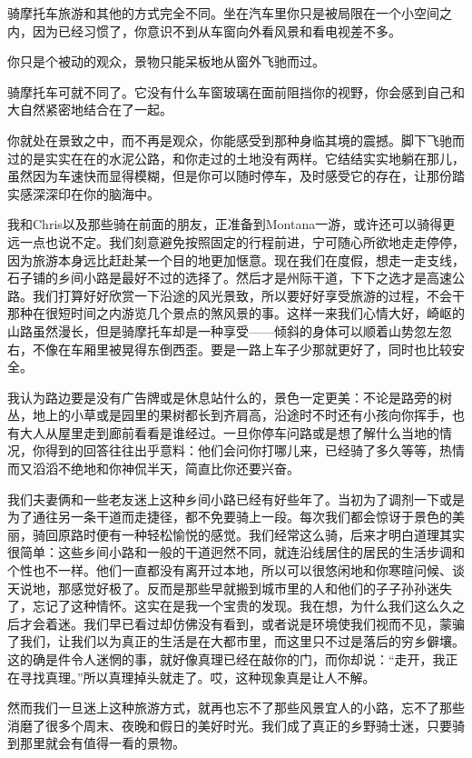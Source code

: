 \documentclass[UTF8]{article}
\begin{document}
\par 骑摩托车旅游和其他的方式完全不同。坐在汽车里你只是被局限在一个小空间之内，因为已经习惯了，你意识不到从车窗向外看风景和看电视差不多。
\par 你只是个被动的观众，景物只能呆板地从窗外飞驰而过。
\par 骑摩托车可就不同了。它没有什么车窗玻璃在面前阻挡你的视野，你会感到自己和大自然紧密地结合在了一起。
\par 你就处在景致之中，而不再是观众，你能感受到那种身临其境的震撼。脚下飞驰而过的是实实在在的水泥公路，和你走过的土地没有两样。它结结实实地躺在那儿，虽然因为车速快而显得模糊，但是你可以随时停车，及时感受它的存在，让那份踏实感深深印在你的脑海中。
\par 我和Chris以及那些骑在前面的朋友，正准备到Montana一游，或许还可以骑得更远一点也说不定。我们刻意避免按照固定的行程前进，宁可随心所欲地走走停停，因为旅游本身远比赶赴某一个目的地更加惬意。现在我们在度假，想走一走支线，石子铺的乡间小路是最好不过的选择了。然后才是州际干道，下下之选才是高速公路。我们打算好好欣赏一下沿途的风光景致，所以要好好享受旅游的过程，不会干那种在很短时间之内游览几个景点的煞风景的事。这样一来我们心情大好，崎岖的山路虽然漫长，但是骑摩托车却是一种享受——倾斜的身体可以顺着山势忽左忽右，不像在车厢里被晃得东倒西歪。要是一路上车子少那就更好了，同时也比较安全。
\par 我认为路边要是没有广告牌或是休息站什么的，景色一定更美：不论是路旁的树丛，地上的小草或是园里的果树都长到齐肩高，沿途时不时还有小孩向你挥手，也有大人从屋里走到廊前看看是谁经过。一旦你停车问路或是想了解什么当地的情况，你得到的回答往往出乎意料：他们会问你打哪儿来，已经骑了多久等等，热情而又滔滔不绝地和你神侃半天，简直比你还要兴奋。
\par 我们夫妻俩和一些老友迷上这种乡间小路已经有好些年了。当初为了调剂一下或是为了通往另一条干道而走捷径，都不免要骑上一段。每次我们都会惊讶于景色的美丽，骑回原路时便有一种轻松愉悦的感觉。我们经常这么骑，后来才明白道理其实很简单：这些乡间小路和一般的干道迥然不同，就连沿线居住的居民的生活步调和个性也不一样。他们一直都没有离开过本地，所以可以很悠闲地和你寒暄问候、谈天说地，那感觉好极了。反而是那些早就搬到城市里的人和他们的子子孙孙迷失了，忘记了这种情怀。这实在是我一个宝贵的发现。我在想，为什么我们这么久之后才会着迷。我们早已看过却仿佛没有看到，或者说是环境使我们视而不见，蒙骗了我们，让我们以为真正的生活是在大都市里，而这里只不过是落后的穷乡僻壤。这的确是件令人迷惘的事，就好像真理已经在敲你的门，而你却说：“走开，我正在寻找真理。”所以真理掉头就走了。哎，这种现象真是让人不解。
\par 然而我们一旦迷上这种旅游方式，就再也忘不了那些风景宜人的小路，忘不了那些消磨了很多个周末、夜晚和假日的美好时光。我们成了真正的乡野骑士迷，只要骑到那里就会有值得一看的景物。
\end{document}
